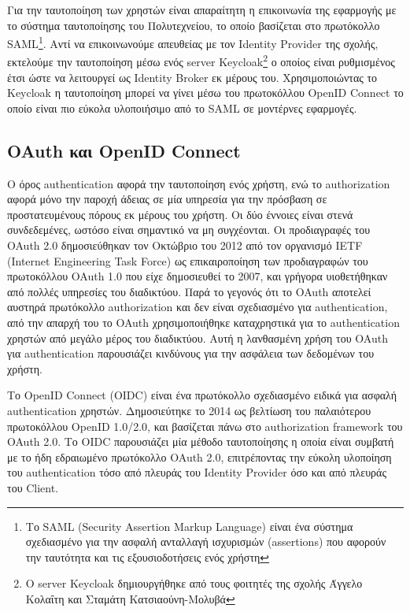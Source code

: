 \documentclass[../thesis.tex]{subfiles}
\begin{document}
Για την ταυτοποίηση των χρηστών είναι απαραίτητη η επικοινωνία της εφαρμογής με το σύστημα ταυτοποίησης του Πολυτεχνείου, το οποίο βασίζεται στο πρωτόκολλο SAML\footnote{Το SAML (Security Assertion Markup Language) είναι ένα σύστημα σχεδιασμένο για την ασφαλή ανταλλαγή ισχυρισμών (assertions) που αφορούν την ταυτότητα και τις εξουσιοδοτήσεις ενός χρήστη}.
Αντί να επικοινωνούμε απευθείας με τον Identity Provider της σχολής, εκτελούμε την ταυτοποίηση μέσω ενός server Keycloak\footnote{Ο server Keycloak δημιουργήθηκε από τους φοιτητές της σχολής Άγγελο Κολαΐτη και Σταμάτη Κατσιαούνη-Μολυβά } ο οποίος είναι ρυθμισμένος έτσι ώστε να λειτουργεί ως Identity Broker εκ μέρους του.
Χρησιμοποιώντας το Keycloak η ταυτοποίηση μπορεί να γίνει μέσω του πρωτοκόλλου OpenID Connect το οποίο είναι πιο εύκολα υλοποιήσιμο από το SAML σε μοντέρνες εφαρμογές.

\subsection*{OAuth και OpenID Connect}
Ο όρος authentication αφορά την ταυτοποίηση ενός χρήστη, ενώ το authorization αφορά μόνο την παροχή άδειας σε μία υπηρεσία για την πρόσβαση σε προστατευμένους πόρους εκ μέρους του χρήστη.
Οι δύο έννοιες είναι στενά συνδεδεμένες, ωστόσο είναι σημαντικό να μη συγχέονται.
Οι προδιαγραφές του OAuth 2.0 δημοσιεύθηκαν τον Οκτώβριο του 2012 από τον οργανισμό IETF (Internet Engineering Task Force) ως επικαιροποίηση των προδιαγραφών του πρωτοκόλλου OAuth 1.0 που είχε δημοσιευθεί το 2007, και γρήγορα υιοθετήθηκαν από πολλές υπηρεσίες του διαδικτύου.
Παρά το γεγονός ότι το OAuth αποτελεί αυστηρά πρωτόκολλο authorization και δεν είναι σχεδιασμένο για authentication, από την απαρχή του το OAuth χρησιμοποιήθηκε καταχρηστικά για το authentication χρηστών από μεγάλο μέρος του διαδικτύου.
Αυτή η λανθασμένη χρήση του OAuth για authentication παρουσιάζει κινδύνους για την ασφάλεια των δεδομένων του χρήστη\cite{oauth_net}.

Το OpenID Connect (OIDC) είναι ένα πρωτόκολλο σχεδιασμένο ειδικά για ασφαλή authentication χρηστών.
Δημοσιεύτηκε το 2014 ως βελτίωση του παλαιότερου πρωτοκόλλου OpenID 1.0/2.0, και βασίζεται πάνω στο authorization framework του OAuth 2.0.
Το OIDC παρουσιάζει μία μέθοδο ταυτοποίησης η οποία είναι συμβατή με το ήδη εδραιωμένο πρωτόκολλο OAuth 2.0, επιτρέποντας την εύκολη υλοποίηση του authentication τόσο από πλευράς του Identity Provider όσο και από πλευράς του Client\cite{oidc_faq}.
\end{document}
